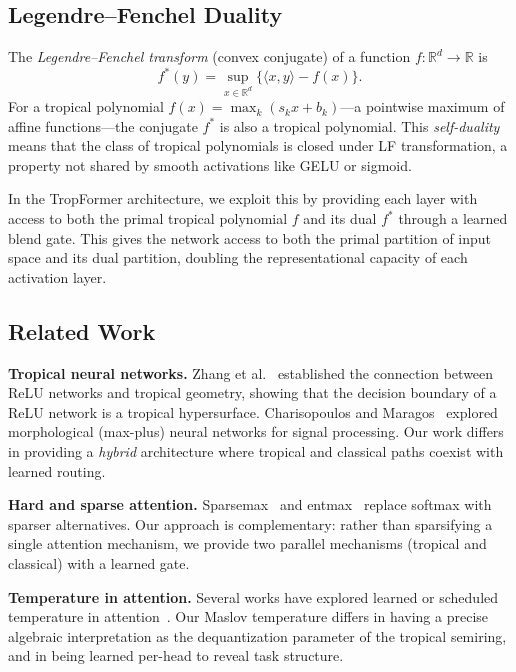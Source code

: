 \documentclass[11pt,twocolumn]{article}
\newcommand{\R}{\mathbb{R}}
\begin{document}
\subsection{Legendre--Fenchel Duality}\label{sec:lf-background}

The \emph{Legendre--Fenchel transform} (convex conjugate) of a function
$f : \R^d \to \R$ is
\begin{equation}\label{eq:lf}
  f^*(y) = \sup_{x \in \R^d} \bigl\{ \langle x, y \rangle - f(x) \bigr\}.
\end{equation}
For a tropical polynomial $f(x) = \max_k(s_k x + b_k)$---a pointwise maximum
of affine functions---the conjugate $f^*$ is also a tropical polynomial. This
\emph{self-duality} means that the class of tropical polynomials is closed under
LF transformation, a property not shared by smooth activations like GELU or
sigmoid.

In the TropFormer architecture, we exploit this by providing each layer with
access to both the primal tropical polynomial $f$ and its dual $f^*$ through a
learned blend gate. This gives the network access to both the primal partition
of input space and its dual partition, doubling the representational capacity
of each activation layer.

\subsection{Related Work}

\textbf{Tropical neural networks.}
Zhang et al.~\cite{zhang2018tropical} established the connection between
ReLU networks and tropical geometry, showing that the decision boundary of a
ReLU network is a tropical hypersurface. Charisopoulos and
Maragos~\cite{charisopoulos2018morphological} explored morphological
(max-plus) neural networks for signal processing. Our work differs in
providing a \emph{hybrid} architecture where tropical and classical paths
coexist with learned routing.

\textbf{Hard and sparse attention.}
Sparsemax~\cite{martins2016softmax} and
entmax~\cite{peters2019sparse} replace softmax with sparser alternatives.
Our approach is complementary: rather than sparsifying a single attention
mechanism, we provide two parallel mechanisms (tropical and classical) with
a learned gate.

\textbf{Temperature in attention.}
Several works have explored learned or scheduled temperature in
attention~\cite{guo2019star}. Our Maslov temperature differs in having a
precise algebraic interpretation as the dequantization parameter of the
tropical semiring, and in being learned per-head to reveal task structure.
\end{document}
